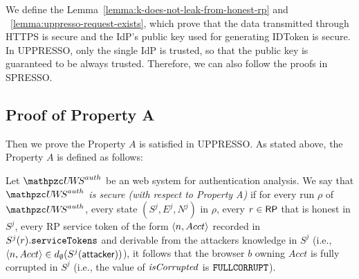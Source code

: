   We define the Lemma~\ref{lemma:k-does-not-leak-from-honest-rp} 
  and ~\ref{lemma:uppresso-request-exists}, which prove 
  that the data transmitted through HTTPS is secure and the 
  IdP's public key used for generating IDToken is secure. 
  In UPPRESSO, only the single IdP is trusted, so that the 
  public key is guaranteed to be always trusted. Therefore, 
  we can also follow the proofs in SPRESSO.
  
  \subsection{Proof of Property A}
  Then we prove the Property $A$ is satisfied in UPPRESSO.
  As stated above, the Property $A$ is defined as follows:
  \begin{definition}\label{def:uppresso-security-property} 
    Let $\uppressoauthwebsystem$ be an \uppresso web system 
    for authentication analysis. We say that 
    \emph{$\uppressoauthwebsystem$ is secure 
    (with respect to Property A)} if for every run $\rho$ of 
    $\uppressoauthwebsystem$, every state $(S^j, E^j, N^j)$ in 
    $\rho$, every $r\in \mathsf{RP}$ that is honest in $S^j$, 
    every RP service token of the form $\langle {{}n, Acct} \rangle$ 
    recorded in $S^j(r).\mathtt{serviceTokens}$ and derivable 
    from the attackers knowledge in $S^j$ (i.e., 
    $\langle {{}n, Acct} \rangle \in 
    d_{\emptyset}(S^j(\mathsf{attacker}))$), it follows that the 
    browser $b$ owning $Acct$ is fully corrupted in $S^j$ 
    (i.e., the value of $\mathit{isCorrupted}$ is $\mathtt{FULLCORRUPT}$). 
  \end{definition}
  
  
